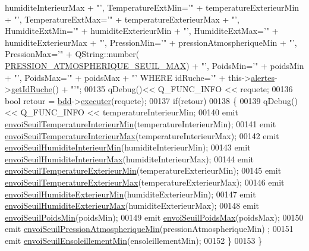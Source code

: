 \begin{DoxyCode}
      humiditeInterieurMax + \textcolor{stringliteral}{"', TemperatureExtMin='"} + temperatureExterieurMin + \textcolor{stringliteral}{"', TemperatureExtMax='"} + 
      temperatureExterieurMax + \textcolor{stringliteral}{"', HumiditeExtMin='"} + humiditeExterieurMin + \textcolor{stringliteral}{"', HumiditeExtMax='"} + 
      humiditeExterieurMax +  \textcolor{stringliteral}{"', PressionMin='"} + pressionAtmospheriqueMin + \textcolor{stringliteral}{"', PressionMax='"} + QString::number(
      \hyperlink{parametres_8h_a2d439ba3af9708601a7ae0edf3584d98}{PRESSION\_ATMOSPHERIQUE\_SEUIL\_MAX}) + \textcolor{stringliteral}{"', PoidsMin='"} + poidsMin + \textcolor{stringliteral}{"',
       PoidsMax='"} + poidsMax + \textcolor{stringliteral}{"' WHERE idRuche='"} + this->\hyperlink{class_reglages_alertes_ihm_a9afa97e737d3c6a9a28a23fc4bc4beeb}{alertes}->\hyperlink{class_alertes_a2374f9e3e5dc95eacaa4eaa5d98540a7}{getIdRuche}() + \textcolor{stringliteral}{"'"};
00135     qDebug()<< Q\_FUNC\_INFO << requete;
00136     \textcolor{keywordtype}{bool} retour = \hyperlink{class_reglages_alertes_ihm_a91b511776c98009cf8f951ec9f3e564e}{bdd}->\hyperlink{class_base_de_donnees_aa8de5f8f8bb17edc43f5c0ee33712081}{executer}(requete);
00137     \textcolor{keywordflow}{if}(retour)
00138     \{
00139         qDebug() << Q\_FUNC\_INFO << temperatureInterieurMin;
00140         emit \hyperlink{class_reglages_alertes_ihm_a44b51f5bfba7a28ee82b5e08d042c153}{envoiSeuilTemperatureInterieurMin}(temperatureInterieurMin);
00141         emit \hyperlink{class_reglages_alertes_ihm_aa2695b931056a81e6e33ae5e9867b872}{envoiSeuilTemperatureInterieurMax}(temperatureInterieurMax);
00142         emit \hyperlink{class_reglages_alertes_ihm_a0d913b26dd22ce48aaebed82a0d3df62}{envoiSeuilHumiditeInterieurMin}(humiditeInterieurMin);
00143         emit \hyperlink{class_reglages_alertes_ihm_ae5e409ea2353cc8e43f312e252b365f9}{envoiSeuilHumiditeInterieurMax}(humiditeInterieurMax);
00144         emit \hyperlink{class_reglages_alertes_ihm_a5c4cadb3f7a76cecc0bafaa297b2898a}{envoiSeuilTemperatureExterieurMin}(temperatureExterieurMin);
00145         emit \hyperlink{class_reglages_alertes_ihm_a626e1067d882bb5c0b86c8e0fb063dcc}{envoiSeuilTemperatureExterieurMax}(temperatureExterieurMax);
00146         emit \hyperlink{class_reglages_alertes_ihm_a78cef50cbaaaa46c837230024129c092}{envoiSeuilHumiditeExterieurMin}(humiditeExterieurMin);
00147         emit \hyperlink{class_reglages_alertes_ihm_a1455ae71d0e6c33b7857a23d116f3248}{envoiSeuilHumiditeExterieurMax}(humiditeExterieurMax);
00148         emit \hyperlink{class_reglages_alertes_ihm_a6d4642c0f64bad9f070ce7988549f8df}{envoiSeuilPoidsMin}(poidsMin);
00149         emit \hyperlink{class_reglages_alertes_ihm_a60d8e26bf08448029f4592b10297bdd1}{envoiSeuilPoidsMax}(poidsMax);
00150         emit \hyperlink{class_reglages_alertes_ihm_a78ea60b683ff8bde49d8bd332eb71c57}{envoiSeuilPressionAtmospheriqueMin}(pressionAtmospheriqueMin)
      ;
00151         emit \hyperlink{class_reglages_alertes_ihm_a1ff9b472f2eed0efece54da863497324}{envoiSeuilEnsoleillementMin}(ensoleillementMin);
00152     \}
00153 \}
\end{DoxyCode}
